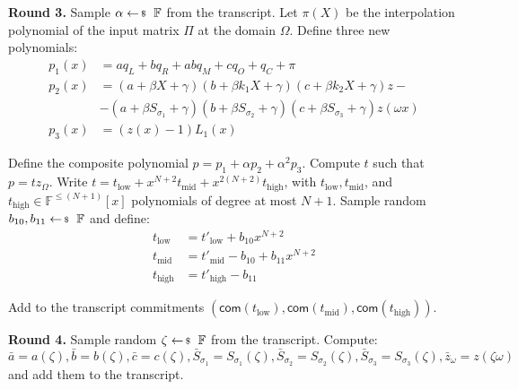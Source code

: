 \documentclass[../../book.tex]{subfiles}
\begin{document}
\textcolor{green!60!black}{\textbf{Round 3.}} Sample $\alpha \leftarrowS
\mathbb{F}$ from the transcript. Let $\pi(X)$ be the interpolation polynomial of the
input matrix $\Pi$ at the domain $\Omega$. Define three new polynomials:
\begin{align*}
p_1(x) &= aq_L + bq_R + abq_M + cq_O + q_C + \pi \\
p_2(x) &= (a + \beta X + \gamma)(b + \beta k_1 X + \gamma)(c + \beta k_2 X + \gamma)z - \\
    &- (a + \beta S_{\sigma_1} + \gamma)(b + \beta S_{\sigma_2} + \gamma)(c + \beta S_{\sigma_3} + \gamma)z(\omega x) \\
p_3(x) &= (z(x) - 1)L_1(x)
\end{align*}

Define the composite polynomial $p = p_1 + \alpha p_2 + \alpha^2 p_3$. Compute
$t$ such that $p = tz_{\Omega}$. Write $t = t_{\text{low}} +
x^{N+2}t_{\text{mid}} + x^{2(N+2)}t_{\text{high}}$, with $t_{\text{low}},
t_{\text{mid}}$, and $t_{\text{high}} \in \mathbb{F}^{\leq (N+1)}[x]$
polynomials of degree at most $N+1$. Sample random $b_{10}, b_{11}
\leftarrowS \mathbb{F}$ and define:
\begin{align*}
t_{\text{low}} &= t'_{\text{low}} + b_{10}x^{N+2} \\
t_{\text{mid}} &= t'_{\text{mid}} - b_{10} + b_{11}x^{N+2} \\
t_{\text{high}} &= t'_{\text{high}} - b_{11}
\end{align*}

Add to the transcript commitments $(\mathsf{com}(t_{\text{low}}), \mathsf{com}(t_{\text{mid}}), \mathsf{com}(t_{\text{high}}))$.

\textcolor{green!60!black}{\textbf{Round 4.}} Sample random $\zeta \leftarrowS
\mathbb{F}$ from the transcript. Compute:
\[\bar{a} = a(\zeta), \bar{b} = b(\zeta), \bar{c} = c(\zeta), \bar{S}_{\sigma_1} = S_{\sigma_1}(\zeta), \bar{S}_{\sigma_2} = S_{\sigma_2}(\zeta), \bar{S}_{\sigma_3} = S_{\sigma_3}(\zeta), \bar{z}_{\omega} = z(\zeta \omega)\]
and add them to the transcript.
\end{document}
